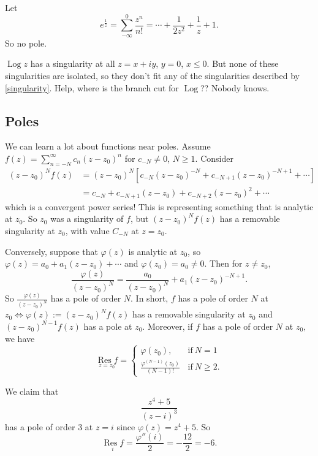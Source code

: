 \begin{example}
Let
\begin{equation*}
    e^{\frac{1}{z}}=\sum_{-\infty}^{0} \frac{z^n }{n!}=\cdots +\frac{1}{2z^2}+\frac{1}{z}+1. 
\end{equation*} So no pole.
\end{example}
\begin{note}
    $\operatorname{Log}z$ has a singularity at all $z=x+iy$, $y=0$, $x\leq 0$. But none of these singularities are isolated, so they don't fit any of the singularities described by \cref{singularity}. Help, where is the branch cut for $\operatorname{Log}$?? Nobody knows.
\end{note}
\subsection{Poles}
We can learn a lot about functions near poles. Assume $f(z)=\sum_{n=-N}^{\infty} c_n (z-z_0)^n $ for $c_{-N}\neq 0$, $N\geq 1$. Consider 
\begin{align*}
    (z-z_0)^Nf(z)&=(z-z_0)^N \left[ c_{-N}(z-z_0)^{-N}+c_{-N+1}(z-z_0)^{-N+1}+\cdots  \right] \\
                 &=c_{-N}+c_{-N+1}(z-z_0)+c_{-N+2}(z-z_0)^2+\cdots 
\end{align*} which is a convergent power series! This is representing something that is analytic at $z_0$. So $z_0$ was a singularity of $f$, but $(z-z_0)^Nf(z)$ has a removable singularity at $z_0$, with value $C_{-N}$ at $z=z_0$.

Conversely, suppose that $\varphi (z)$ is analytic at $z_0$, so $\varphi (z)=a_0+a_1(z-z_0)+\cdots $ and $\varphi (z_0)=a_0\neq 0$. Then for $z\neq z_0$, \[
    \frac{\varphi (z)}{(z-z_0)^N}=\frac{a_0}{(z-z_0)^N}+a_1(z-z_0)^{-N+1}.
\] So $\frac{\varphi (z)}{(z-z_0)^N}$ has a pole of order $N$. In short, $f$ has a pole of order $N$ at $z_0\iff \varphi (z):=(z-z_0)^Nf(z)$ has a removable singularity at $z_0$ and $(z-z_0)^{N-1}f(z)$ has a pole at $z_0$.
    \orbreak
Moreover, if $f$ has a pole of order $N$ at $z_0,$ we have \[
\underset{z=z_0}{\operatorname{R es}f} =
\begin{cases}
    \varphi (z_0),\quad &\text{if} \ N=1\\
    \frac{\varphi ^{(N-1)}(z_0)}{(N-1)!} &\text{if} \ N\geq 2.
\end{cases}
\] 
\begin{example}
    We claim that \[
        \frac{z^4+5}{(z-i)^3}
    \] has a pole of order $3$ at $z=i$ since $\varphi (z)=z^4+5$. So \[
    \underset{i}{\operatorname{R es}f} =\frac{\varphi ''(i)}{2}=-\frac{12}{2}=-6.
    \] 
\end{example}
